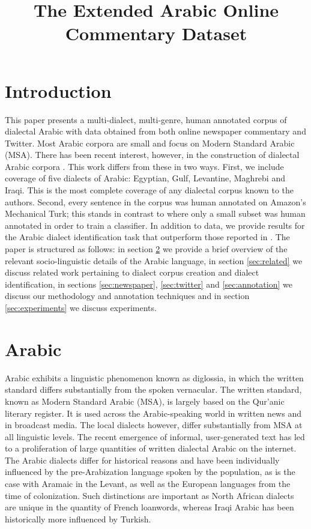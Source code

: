 \documentclass[10pt, a4paper]{article}
\title{The Extended Arabic Online Commentary Dataset}
\begin{document}
\maketitleabstract

\section{Introduction}
This paper presents a multi-dialect, multi-genre, human annotated
corpus of dialectal Arabic with data obtained from both online newspaper
commentary and Twitter. Most Arabic corpora are small and focus on
Modern Standard Arabic (MSA). There has been recent interest, however,
in the construction of dialectal Arabic corpora
\cite{zaidan2011arabic,al2012yadac} . This work differs from these in
two ways. First, we include coverage of five dialects of Arabic:
Egyptian, Gulf, Levantine, Maghrebi and Iraqi. This is the most
complete coverage of any dialectal corpus known to the
authors. Second, every sentence in the corpus was human annotated on
Amazon's Mechanical Turk; this stands in contrast to
 where only a small subset was human annotated in
order to train a classifier. In addition to data, we provide results for
the Arabic dialect identification task that outperform those reported in
. The paper is structured as follows:
in section \ref{sec:arabic} we provide a brief overview of the
relevant socio-linguistic details of the Arabic language, in section
\ref{sec:related} we discuss related work pertaining to dialect corpus
creation and dialect identification, in sections
\ref{sec:newspaper}, \ref{sec:twitter} and \ref{sec:annotation} we discuss our 
methodology and
annotation techniques and in section \ref{sec:experiments} 
we discuss experiments.


\section{Arabic}\label{sec:arabic}
Arabic exhibits a linguistic phenomenon known as diglossia, in which
the written standard differs substantially from the spoken
vernacular. The written standard, known as Modern Standard Arabic
(MSA), is largely based on the Qur'anic literary register. It is used
across the Arabic-speaking world in written news and in broadcast media. The
local dialects however, differ substantially from MSA at all
linguistic levels. The recent emergence of informal, user-generated
text has led to a proliferation of large quantities of written
dialectal Arabic on the internet. The Arabic dialects differ for
historical reasons and have been individually influenced by the
pre-Arabization language spoken by the population, as is the case with
Aramaic in the Levant, as well as the European languages from the time
of colonization. Such distinctions are important as North African
dialects are unique in the quantity of French loanwords, whereas Iraqi
Arabic has been historically more influenced by Turkish.
\end{document}
